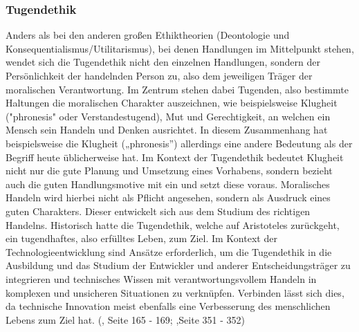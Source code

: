 \subsubsection{Tugendethik}
Anders als bei den anderen großen Ethiktheorien (Deontologie und Konsequentialismus/Utilitarismus), bei denen Handlungen im Mittelpunkt stehen, wendet sich die Tugendethik nicht den einzelnen Handlungen, sondern der Persönlichkeit der handelnden Person zu, also dem jeweiligen Träger der moralischen Verantwortung. Im Zentrum stehen dabei Tugenden, also bestimmte Haltungen die moralischen Charakter auszeichnen, wie beispielsweise Klugheit ("phronesis" oder Verstandestugend), Mut und Gerechtigkeit, an welchen ein Mensch sein Handeln und Denken ausrichtet. In diesem Zusammenhang hat beispielsweise die Klugheit („phronesis”) allerdings eine andere Bedeutung als der Begriff heute üblicherweise hat. Im Kontext der Tugendethik bedeutet Klugheit nicht nur die gute Planung und Umsetzung eines Vorhabens, sondern bezieht auch die guten Handlungsmotive mit ein und setzt diese voraus. Moralisches Handeln wird hierbei nicht als Pflicht angesehen, sondern als Ausdruck eines guten Charakters. Dieser entwickelt sich aus dem Studium des richtigen Handelns. Historisch hatte die Tugendethik, welche auf Aristoteles zurückgeht, ein tugendhaftes, also erfülltes Leben, zum Ziel. Im Kontext der Technologieentwicklung sind Ansätze erforderlich, um die Tugendethik in die Ausbildung und das Studium der Entwickler und anderer Entscheidungsträger zu integrieren und technisches Wissen mit verantwortungsvollem Handeln in komplexen und unsicheren Situationen zu verknüpfen. Verbinden lässt sich dies, da technische Innovation meist ebenfalls eine Verbesserung des menschlichen Lebens zum Ziel hat. (\cite{grunwaldHandbuchTechnikethik2021}, Seite 165 - 169; \cite{corcilius_phronesis_2021},Seite 351 - 352)


